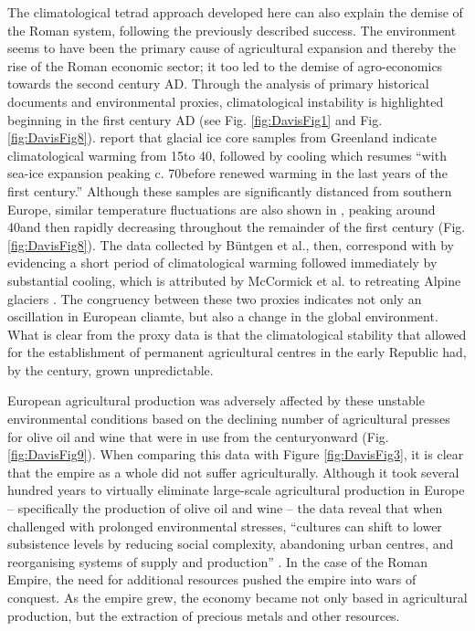 The climatological tetrad approach developed here can also explain the demise of the Roman system, following the previously described success. The environment seems to have been the primary cause of agricultural expansion and thereby the rise of the Roman economic sector; it too led to the demise of agro-economics towards the second century AD. Through the analysis of primary historical documents and environmental proxies, climatological instability is highlighted beginning in the first century AD (see Fig. \ref{fig:DavisFig1} and Fig. \ref{fig:DavisFig8}). \textcite[175]{McCormick_2012} report that glacial ice core samples from Greenland indicate climatological warming from 15\BC to 40\AD, followed by cooling which resumes “with sea-ice expansion peaking c. 70\AD before renewed warming in the last years of the first century.” Although these samples are significantly distanced from southern Europe, similar temperature fluctuations are also shown in \textcite{Büntgen_2011b}, peaking around 40\AD and then rapidly decreasing throughout the remainder of the first century (Fig. \ref{fig:DavisFig8}). The data collected by Büntgen et al., then, correspond with \textcite{McCormick_2012} by evidencing a short period of climatological warming followed immediately by substantial cooling, which is attributed by McCormick et al. to retreating Alpine glaciers \parencites{Büntgen_2011a}{Büntgen_2011b}[175--180]{McCormick_2012}. 
The congruency between these two proxies indicates not only an oscillation in European cliamte, but also a change in the global environment. What is clear from the proxy data is that the climatological stability that allowed for the establishment of permanent agricultural centres in the early Republic had, by the  century\AD, grown unpredictable.



European agricultural production was adversely affected by these unstable environmental conditions based on the declining number of agricultural presses for olive oil and wine that were in use from the  century\AD onward (Fig. \ref{fig:DavisFig9}). When comparing this data with Figure \ref{fig:DavisFig3}, it is clear that the empire as a whole did not suffer agriculturally. Although it took several hundred years to virtually eliminate large-scale agricultural production in Europe – specifically the production of olive oil and wine – the data reveal that when challenged with prolonged environmental stresses, “cultures can shift to lower subsistence levels by reducing social complexity, abandoning urban centres, and reorganising systems of supply and production” \parencite[672]{deMenocal_2001}. In the case of the Roman Empire, the need for additional resources pushed the empire into wars of conquest. As the empire grew, the economy became not only based in agricultural production, but the extraction of precious metals and other resources.

